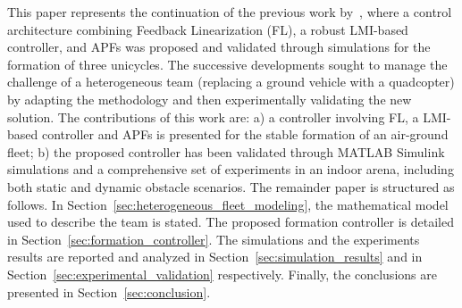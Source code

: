 \documentclass{ifacconf}
\begin{document}

This paper represents the continuation of the previous work by~\cite{Morando2025SOSE},
where a control architecture combining Feedback Linearization (FL), 
a robust LMI-based controller, and APFs was proposed 
and validated through simulations for 
the formation of three unicycles.
The successive developments sought to manage the challenge
of a heterogeneous team (replacing a ground vehicle with a quadcopter)
by adapting the methodology and then experimentally validating 
the new solution.
The contributions of this work are: a) a controller involving FL, a LMI-based controller and APFs 
is presented for the stable formation of an air-ground fleet;
b) the proposed controller has been validated through MATLAB Simulink
simulations and a comprehensive set of experiments in an indoor arena, including both static
and dynamic obstacle scenarios.
The remainder paper is structured as follows. 
In Section~\ref{sec:heterogeneous_fleet_modeling}, 
the mathematical model used to describe the team is stated.
The proposed formation controller is detailed in Section~\ref{sec:formation_controller}.
The simulations and the experiments results are reported and analyzed
in Section~\ref{sec:simulation_results} and 
in Section~\ref{sec:experimental_validation} respectively.
Finally, the conclusions are presented in Section~\ref{sec:conclusion}.
\end{document}
